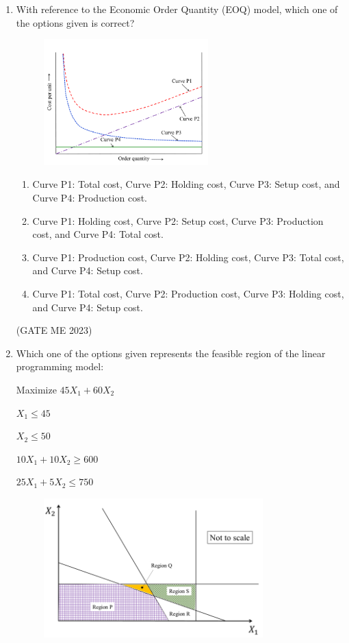 \documentclass[journal]{IEEEtran}
\begin{document}
\begin{enumerate}
\item With reference to the Economic Order Quantity (EOQ) model, which one of the options given is correct?
\begin{figure}[H]
\centering
\includegraphics[width=0.6\textwidth]{Fig 5.png}
\caption{}
\label{fig:question13}
\end{figure}

\begin{enumerate}
    \item Curve P1: Total cost, Curve P2: Holding cost, Curve P3: Setup cost, and Curve P4: Production cost.
    \item Curve P1: Holding cost, Curve P2: Setup cost, Curve P3: Production cost, and Curve P4: Total cost.
    \item Curve P1: Production cost, Curve P2: Holding cost, Curve P3: Total cost, and Curve P4: Setup cost.
    \item Curve P1: Total cost, Curve P2: Production cost, Curve P3: Holding cost, and Curve P4: Setup cost.
\end{enumerate}
\hfill (GATE ME 2023)

\item Which one of the options given represents the feasible region of the linear programming model:

\begin{center}
Maximize $ 45X_1 + 60X_2 $

$ X_1 \leq 45 $

$ X_2 \leq 50 $

$ 10X_1 + 10X_2 \geq 600 $

$ 25X_1 + 5X_2 \leq 750 $
\end{center}

\begin{figure}[H]
\centering
\includegraphics[width=0.8\textwidth]{Fig 6.png}
\caption{}
\label{fig:question14}
\end{figure}


\end{enumerate}
\end{document}
